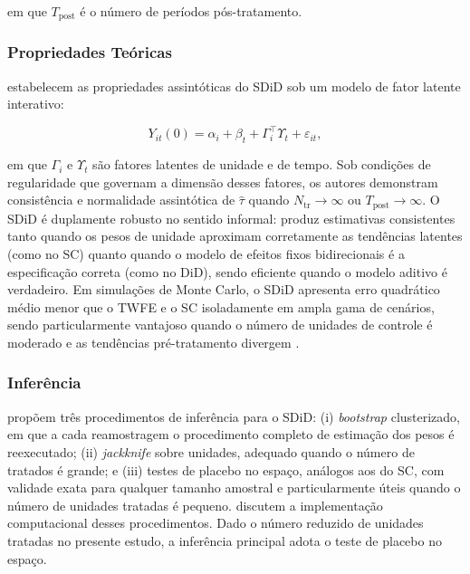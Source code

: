 \documentclass[a4paper,12pt]{article}
\begin{document}
em que $T_{\mathrm{post}}$ é o número de períodos pós-tratamento.

\subsubsection{Propriedades Teóricas}

 estabelecem as propriedades assintóticas do SDiD sob um
modelo de fator latente interativo:

\begin{equation}
Y_{it}(0) = \alpha_i + \beta_t + \Gamma_i^{\top} \Upsilon_t + \varepsilon_{it},
\end{equation}

em que $\Gamma_i$ e $\Upsilon_t$ são fatores latentes de unidade e de tempo. Sob
condições de regularidade que governam a dimensão desses fatores, os autores demonstram
consistência e normalidade assintótica de $\hat{\tau}$ quando
$N_{\mathrm{tr}} \to \infty$ ou $T_{\mathrm{post}} \to \infty$. O SDiD é duplamente
robusto no sentido informal: produz estimativas consistentes tanto quando os pesos de
unidade aproximam corretamente as tendências latentes (como no SC) quanto quando o
modelo de efeitos fixos bidirecionais é a especificação correta (como no DiD), sendo
eficiente quando o modelo aditivo é verdadeiro. Em simulações de Monte Carlo, o SDiD
apresenta erro quadrático médio menor que o TWFE e o SC isoladamente em ampla gama de
cenários, sendo particularmente vantajoso quando o número de unidades de controle é
moderado e as tendências pré-tratamento divergem \cite{arkhangelsky2021}.

\subsubsection{Inferência}

 propõem três procedimentos de inferência para o SDiD: (i)
\textit{bootstrap} clusterizado, em que a cada reamostragem o procedimento completo de
estimação dos pesos é reexecutado; (ii) \textit{jackknife} sobre unidades, adequado quando
o número de tratados é grande; e (iii) testes de placebo no espaço, análogos aos do SC,
com validade exata para qualquer tamanho amostral e particularmente úteis quando o
número de unidades tratadas é pequeno.  discutem a implementação
computacional desses procedimentos. Dado o número reduzido de unidades tratadas no
presente estudo, a inferência principal adota o teste de placebo no espaço.
\end{document}
